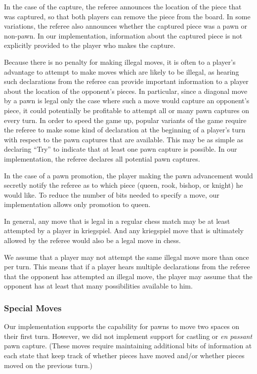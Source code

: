 \documentclass[conference]{IEEEtran}
\begin{document}
In the case of the capture, the referee announces the location of the piece that was captured, so that both players can
remove the piece from the board.  In some variations, the referee also announces whether the captured piece was a pawn
or non-pawn.  In our implementation, information about the captured piece is not explicitly provided to the player who
makes the capture.

Because there is no penalty for making illegal moves, it is often to a player's advantage to attempt to make moves which
are likely to be illegal, as hearing such declarations from the referee can provide important information to a player
about the location of the opponent's pieces.  In particular, since a diagonal move by a pawn is legal only the case
where such a move would capture an opponent's piece, it could potentially be profitable to attempt all or many pawn
captures on every turn.  In order to speed the game up, popular variants of the game require the referee to make some
kind of declaration at the beginning of a player's turn with respect to the pawn captures that are available.  This may
be as simple as declaring ``Try'' to indicate that at least one pawn capture is possible.  In our implementation, the
referee declares all potential pawn captures.

In the case of a pawn promotion, the player making the pawn advancement would secretly notify the referee as to which
piece (queen, rook, bishop, or knight) he would like.  To reduce the number of bits needed to specify a move, our
implementation allows only promotion to queen. 

In general, any move that is legal in a regular chess match may be at least attempted by a player in kriegspiel.  And
any kriegspiel move that is ultimately allowed by the referee would also be a legal move in chess.    

We assume that a player may not attempt the same illegal move more than once per turn.  This means that if a player
hears multiple declarations from the referee that the opponent has attempted an illegal move, the player may assume that
the opponent has at least that many possibilities available to him.

\subsubsection{Special Moves}
Our implementation supports the capability for pawns to move two spaces on their first turn.  However, we did not
implement support for castling or {\em en passant} pawn capture.  (These moves require maintaining additional bits of
information at each state that keep track of whether pieces have moved and/or whether pieces moved on the previous
turn.) 
\end{document}

